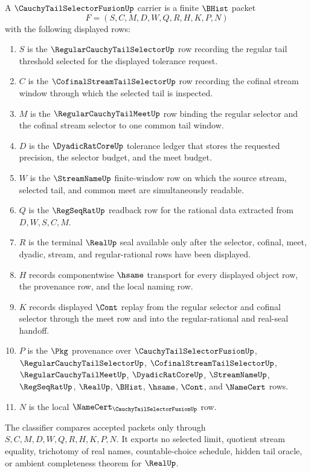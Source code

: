 \begin{definition}
\label{def:cauchy-tail-selector-fusion-carrier}
A $\CauchyTailSelectorFusionUp$ carrier is a finite $\BHist$ packet
$$
F=(S,C,M,D,W,Q,R,H,K,P,N)
$$
with the following displayed rows:
\begin{enumerate}
\item $S$ is the $\RegularCauchyTailSelectorUp$ row recording the regular tail threshold selected for the displayed tolerance request.
\item $C$ is the $\CofinalStreamTailSelectorUp$ row recording the cofinal stream window through which the selected tail is inspected.
\item $M$ is the $\RegularCauchyTailMeetUp$ row binding the regular selector and the cofinal stream selector to one common tail window.
\item $D$ is the $\DyadicRatCoreUp$ tolerance ledger that stores the requested precision, the selector budget, and the meet budget.
\item $W$ is the $\StreamNameUp$ finite-window row on which the source stream, selected tail, and common meet are simultaneously readable.
\item $Q$ is the $\RegSeqRatUp$ readback row for the rational data extracted from $D,W,S,C,M$.
\item $R$ is the terminal $\RealUp$ seal available only after the selector, cofinal, meet, dyadic, stream, and regular-rational rows have been displayed.
\item $H$ records componentwise $\hsame$ transport for every displayed object row, the provenance row, and the local naming row.
\item $K$ records displayed $\Cont$ replay from the regular selector and cofinal selector through the meet row and into the regular-rational and real-seal handoff.
\item $P$ is the $\Pkg$ provenance over $\CauchyTailSelectorFusionUp$, $\RegularCauchyTailSelectorUp$, $\CofinalStreamTailSelectorUp$, $\RegularCauchyTailMeetUp$, $\DyadicRatCoreUp$, $\StreamNameUp$, $\RegSeqRatUp$, $\RealUp$, $\BHist$, $\hsame$, $\Cont$, and $\NameCert$ rows.
\item $N$ is the local $\NameCert_{\CauchyTailSelectorFusionUp}$ row.
\end{enumerate}
The classifier compares accepted packets only through $S,C,M,D,W,Q,R,H,K,P,N$. It exports no selected limit, quotient stream equality, trichotomy of real names, countable-choice schedule, hidden tail oracle, or ambient completeness theorem for $\RealUp$.
\end{definition}

